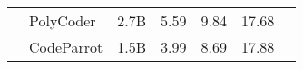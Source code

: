\begin{table}[t]
{{\begin{tabular}{clccccc}
         & PolyCoder \cite{xu2022systematic} & 2.7B & 5.59      & 9.84    & 17.68& \\
         & CodeParrot \cite{tunstall2022natural} & 1.5B & 3.99      & 8.69    & 17.88& \\  
    \bottomrule
    \end{tabular}
}
}
\vspace{-10pt}
\end{table}